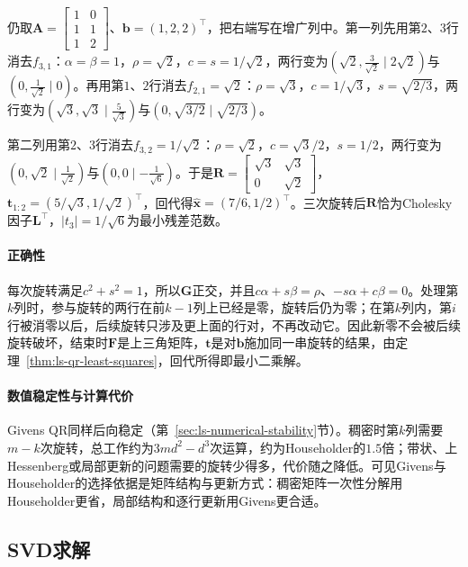 \begin{example}[直线拟合的Givens三角化]
\label{ex:ls-givens-line-fit}
仍取$\bm A=\left[\begin{smallmatrix}1&0\\1&1\\1&2\end{smallmatrix}\right]$、$\bm b=(1,2,2)^\top$，把右端写在增广列中。第一列先用第$2$、$3$行消去$f_{3,1}$：$\alpha=\beta=1$，$\rho=\sqrt2$，$c=s=1/\sqrt2$，两行变为$(\sqrt2,\tfrac3{\sqrt2}\mid2\sqrt2)$与$(0,\tfrac1{\sqrt2}\mid0)$。再用第$1$、$2$行消去$f_{2,1}=\sqrt2$：$\rho=\sqrt3$，$c=1/\sqrt3$，$s=\sqrt{2/3}$，两行变为$(\sqrt3,\sqrt3\mid\tfrac5{\sqrt3})$与$(0,\sqrt{3/2}\mid\sqrt{2/3})$。

第二列用第$2$、$3$行消去$f_{3,2}=1/\sqrt2$：$\rho=\sqrt2$，$c=\sqrt3/2$，$s=1/2$，两行变为$(0,\sqrt2\mid\tfrac1{\sqrt2})$与$(0,0\mid-\tfrac1{\sqrt6})$。于是$\bm R=\left[\begin{smallmatrix}\sqrt3&\sqrt3\\0&\sqrt2\end{smallmatrix}\right]$，$\bm t_{1:2}=(5/\sqrt3,1/\sqrt2)^\top$，回代得$\hat{\bm x}=(7/6,1/2)^\top$。三次旋转后$\bm R$恰为Cholesky因子$\bm L^\top$，$\lvert t_3\rvert=1/\sqrt6$为最小残差范数。
\end{example}

\paragraph{正确性}
每次旋转满足$c^2+s^2=1$，所以$\bm G$正交，并且$c\alpha+s\beta=\rho$、$-s\alpha+c\beta=0$。处理第$k$列时，参与旋转的两行在前$k-1$列上已经是零，旋转后仍为零；在第$k$列内，第$i$行被消零以后，后续旋转只涉及更上面的行对，不再改动它。因此新零不会被后续旋转破坏，结束时$\bm F$是上三角矩阵，$\bm t$是对$\bm b$施加同一串旋转的结果，由定理~\ref{thm:ls-qr-least-squares}，回代所得即最小二乘解。

\paragraph{数值稳定性与计算代价}
Givens QR同样后向稳定（第~\ref{sec:ls-numerical-stability}节）。稠密时第$k$列需要$m-k$次旋转，总工作约为$3md^2-d^3$次运算，约为Householder的$1.5$倍；带状、上Hessenberg或局部更新的问题需要的旋转少得多，代价随之降低。可见Givens与Householder的选择依据是矩阵结构与更新方式：稠密矩阵一次性分解用Householder更省，局部结构和逐行更新用Givens更合适。

\subsection{SVD求解}
\label{sec:ls-svd-solve}

